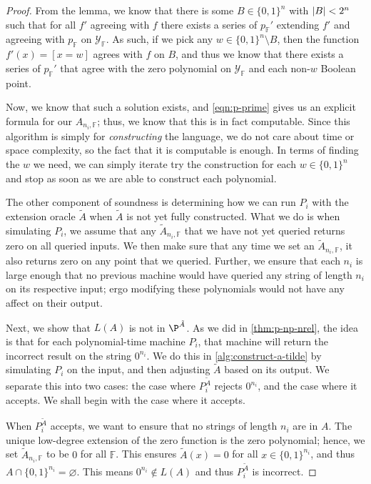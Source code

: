 \documentclass[english,12pt]{reedthesis}
\theoremstyle{plain}
\theoremstyle{definition}
\theoremstyle{remark}
\DeclarePairedDelimiter{\abs}{\lvert}{\rvert}
\begin{document}
\begin{proof}
  From the lemma, we know that there is some $B \in \{0, 1\}^{n}$ with
  $\abs{B} < 2^{n}$ such that for all $f'$ agreeing with $f$ there exists a
  series of $p_{\mathbb{F}}'$ extending $f'$ and agreeing with $p_{\mathbb{F}}$
  on $\mathcal{Y}_{\mathbb{F}}$. As such, if we pick any $w \in \{0, 1\}^{n} \setminus B$, then the
  function $f'(x) = [x = w]$ agrees with $f$ on $B$, and thus we know that there
  exists a series of $p_{\mathbb{F}}'$ that agree with the zero polynomial on
  $\mathcal{Y}_{\mathbb{F}}$ and each non-$w$ Boolean point.

  Now, we know that such a solution exists, and \cref{eqn:p-prime} gives us an
  explicit formula for our $A_{n_{i},\mathbb{F}}$; thus, we know that this is in
  fact computable. Since this algorithm is simply for \emph{constructing} the
  language, we do not care about time or space complexity, so the fact that it
  is computable is enough. In terms of finding the $w$ we need, we can simply
  iterate try the construction for each $w \in \{0, 1\}^{n}$ and stop as soon as
  we are able to construct each polynomial.

  The other component of soundness is determining how we can run $P_{i}$ with
  the extension oracle $\tilde{A}$ when $\tilde{A}$ is not yet fully
  constructed. What we do is when simulating $P_{i}$, we assume that any
  $\tilde{A}_{n_{i},\mathbb{F}}$ that we have not yet queried returns zero on
  all queried inputs. We then make sure that any time we set an
  $\tilde{A}_{n_{i},\mathbb{F}}$, it also returns zero on any point that we
  queried. Further, we ensure that each $n_{i}$ is large enough that no previous
  machine would have queried any string of length $n_{i}$ on its respective
  input; ergo modifying these polynomials would not have any affect on their
  output.

  Next, we show that $L(A)$ is not in $\P^{\tilde{A}}$. As we did in
  \cref{thm:p-np-nrel}, the idea is that for each polynomial-time machine
  $P_{i}$, that machine will return the incorrect result on the string
  $0^{n_{i}}$. We do this in \cref{alg:construct-a-tilde} by simulating $P_{i}$
  on the input, and then adjusting $\tilde{A}$ based on its output. We separate
  this into two cases: the case where $P_{i}^{\tilde{A}}$ rejects $0^{n_{i}}$,
  and the case where it accepts. We shall begin with the case where it accepts.

  When $P_{i}^{\tilde{A}}$ accepts, we want to ensure that no strings of length
  $n_{i}$ are in $A$. The unique low-degree extension of the zero function is
  the zero polynomial; hence, we set $\tilde{A}_{n_{i},\mathbb{F}}$ to be $0$
  for all $\mathbb{F}$. This ensures $\tilde{A}(x) = 0$ for all
  $x \in \{0, 1\}^{n_{i}}$, and thus $A \cap \{0, 1\}^{n_{i}} = \varnothing$. This
  means $0^{n_{i}} \notin L(A)$ and thus $P_{i}^{\tilde{A}}$ is incorrect.


\end{proof}
\end{document}
